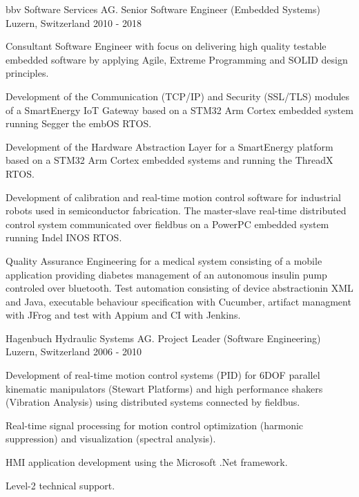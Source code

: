 \begin{cventries}
\cventry
{bbv Software Services AG.} %
{Senior Software Engineer (Embedded Systems)} %
{Luzern, Switzerland} %
{2010 - 2018} %
{
  \begin{cvitems} %
    \item {
        Consultant Software Engineer with focus on delivering high quality 
        testable embedded software by applying Agile, Extreme Programming and SOLID
        design principles.}
    \item {
        Development of the Communication (TCP/IP) and Security (SSL/TLS) modules of
        a SmartEnergy IoT Gateway based on a STM32 Arm Cortex embedded system running Segger the embOS RTOS.}
    \item {
        Development of the Hardware Abstraction Layer for a SmartEnergy platform 
        based on a STM32 Arm Cortex embedded systems and running the ThreadX RTOS.}
    \item {
        Development of calibration and real-time motion control software for
        industrial robots used in semiconductor fabrication. The master-slave 
        real-time distributed control system communicated over fieldbus on a PowerPC embedded system
        running Indel INOS RTOS.
        }
    \item {
        Quality Assurance Engineering for a medical system consisting of a mobile application 
        providing diabetes management of an autonomous insulin pump controled over bluetooth. 
        Test automation consisting of device abstractionin XML and Java,  executable behaviour specification with Cucumber, 
        artifact managment with JFrog and test with Appium and CI with Jenkins. 
        }
  \end{cvitems}
}

\cventry
{Hagenbuch Hydraulic Systems AG.} %
{Project Leader (Software Engineering)} %
{Luzern, Switzerland} %
{2006 - 2010} %
{
  \begin{cvitems} %
    \item {
        Development of real-time motion control systems (PID) for 6DOF parallel 
        kinematic manipulators (Stewart Platforms) and high performance shakers 
        (Vibration Analysis) using distributed systems connected by fieldbus.}
    \item {
        Real-time signal processing for motion control optimization 
        (harmonic suppression) and visualization (spectral analysis).}
    \item {
        HMI application development using the Microsoft .Net framework.}
    \item {
        Level-2 technical support.}
  \end{cvitems}
}


\end{cventries}
